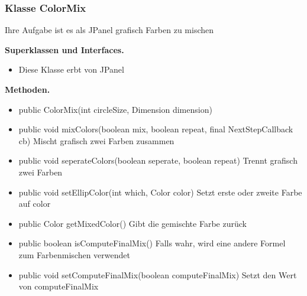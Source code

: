 \documentclass{article}
\begin{document}
	\subsubsection{Klasse ColorMix}
    Ihre Aufgabe ist es als JPanel grafisch Farben zu mischen\newline

	    \textbf{Superklassen und Interfaces.}\newline
	   \begin{itemize}
            \item Diese Klasse erbt von JPanel\newline
           \end{itemize}

    \textbf{Methoden.}\newline
	   \begin{itemize}
           \item public ColorMix(int circleSize, Dimension dimension) \newline
           \item public void mixColors(boolean mix, boolean repeat, final NextStepCallback cb) \newline
               Mischt grafisch zwei Farben zusammen\newline
           \item public void seperateColors(boolean seperate, boolean repeat) \newline
               Trennt grafisch zwei Farben\newline
           \item public void setEllipColor(int which, Color color) \newline
               Setzt erste oder zweite Farbe auf color\newline
           \item public Color getMixedColor() \newline
               Gibt die gemischte Farbe zurück\newline
           \item public boolean isComputeFinalMix() \newline
               Falls wahr, wird eine andere Formel zum Farbenmischen verwendet\newline
           \item public void setComputeFinalMix(boolean computeFinalMix)\newline
               Setzt den Wert von computeFinalMix\newline
           \end{itemize}
\end{document}

